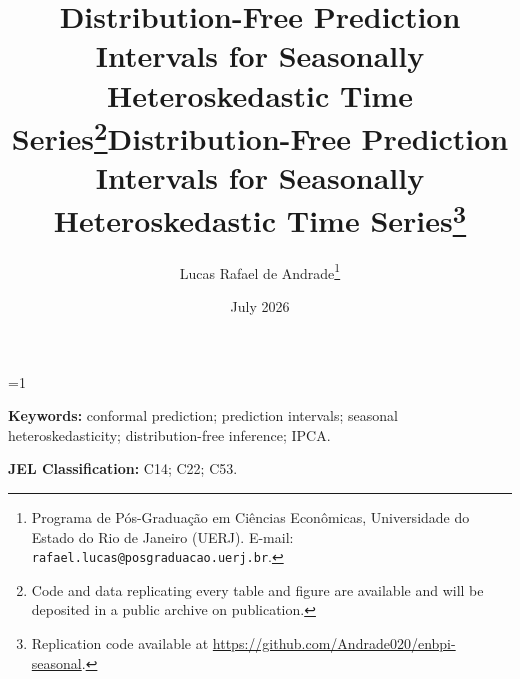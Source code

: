 \documentclass[12pt,a4paper]{article}
\theoremstyle{plain}
\theoremstyle{definition}
\theoremstyle{remark}
\begin{document}
\providecommand{\blindmode}{0}

\ifnum\blindmode=1
  \title{Distribution-Free Prediction Intervals for Seasonally
         Heteroskedastic Time Series\thanks{%
           Code and data replicating every table and figure are
           available and will be deposited in a public archive on
           publication.}}
  \author{}
\else
  \title{Distribution-Free Prediction Intervals for Seasonally
         Heteroskedastic Time Series\thanks{%
           Replication code available at
           \url{https://github.com/Andrade020/enbpi-seasonal}.}}
  \author{Lucas Rafael de Andrade\thanks{%
          Programa de P\'{o}s-Gradua\c{c}\~{a}o em Ci\^{e}ncias Econ\^{o}micas,
          Universidade do Estado do Rio de Janeiro (UERJ).
          E-mail: \texttt{rafael.lucas@posgraduacao.uerj.br}.}}
\fi

\date{July 2026}

\maketitle

\begin{abstract}

\end{abstract}

\noindent\textbf{Keywords:} conformal prediction; prediction intervals;
seasonal heteroskedasticity; distribution-free inference; IPCA.

\noindent\textbf{JEL Classification:} C14; C22; C53.

\newpage
\tableofcontents
\newpage










\newpage


\appendix


\end{document}
